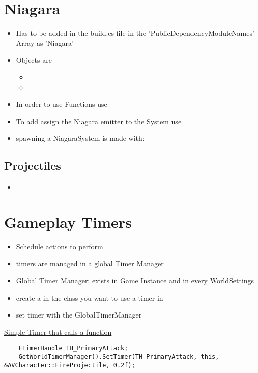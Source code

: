     \section{Niagara}
        \begin{itemize}
            \item Has to be added in the build.cs file in the 'PublicDependencyModuleNames' Array as 'Niagara'
            \item Objects are
            \begin{itemize}
                \item {}
                \item {}
            \end{itemize}
            \item In order to use Functions use 
            \item To add assign the Niagara emitter to the System use  
            \item spawning a NiagaraSystem is made with: 
        \end{itemize}

        \subsection{Projectiles}
            \begin{itemize}
                \item 
            \end{itemize}

    \section{Gameplay Timers}
        \begin{itemize}
            \item Schedule actions to perform
            \item timers are managed in a global Timer Manager
            \item Global Timer Manager: exists in Game Instance and in every WorldSettings
        \end{itemize}
        \begin{itemize}
            \item create a  in the class you want to use a timer in
            \item set timer with the GlobalTimerManager
        \end{itemize}
        \uline{Simple Timer that calls a function}
        \begin{lstlisting}
    FTimerHandle TH_PrimaryAttack;
    GetWorldTimerManager().SetTimer(TH_PrimaryAttack, this, &AVCharacter::FireProjectile, 0.2f);
        \end{lstlisting}

